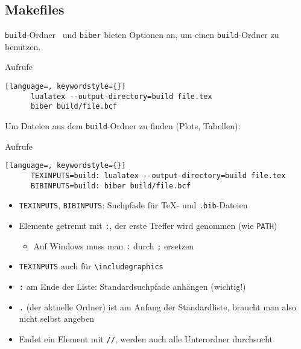 \subsection{Makefiles}

\begin{frame}[fragile]{\texttt{build}-Ordner}
  \LuaTeX\ und \texttt{biber} bieten Optionen an, um einen \texttt{build}-Ordner zu benutzen.
  \begin{block}{Aufrufe}
    \begin{lstlisting}[language=, keywordstyle={}]
      lualatex --output-directory=build file.tex
      biber build/file.bcf
    \end{lstlisting}
  \end{block}

  Um Dateien aus dem \texttt{build}-Ordner zu finden (Plots, Tabellen):
  \begin{block}{Aufrufe}
    \begin{lstlisting}[language=, keywordstyle={}]
      TEXINPUTS=build: lualatex --output-directory=build file.tex
      BIBINPUTS=build: biber build/file.bcf
    \end{lstlisting}
  \end{block}
  \vspace*{-0.5em}
  \begin{itemize}
    \item \texttt{TEXINPUTS}, \texttt{BIBINPUTS}: Suchpfade für \TeX- und \texttt{.bib}-Dateien
    \item Elemente getrennt mit \texttt{:}, der erste Treffer wird genommen (wie \texttt{PATH})
      \begin{itemize}
        \item Auf Windows muss man \texttt{:} durch \texttt{;} ersetzen
      \end{itemize}
    \item \texttt{TEXINPUTS} auch für \lstinline+\includegraphics+
    \item \texttt{:} am Ende der Liste: Standardsuchpfade anhängen (wichtig!)
    \item \texttt{.} (der aktuelle Ordner) ist am Anfang der Standardliste, braucht man also nicht selbst angeben
    \item Endet ein Element mit \texttt{//}, werden auch alle Unterordner durchsucht
  \end{itemize}
\end{frame}

